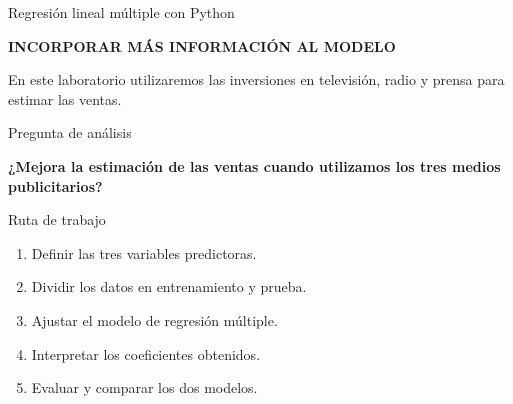 \documentclass[aspectratio=169,11pt]{beamer}
\newcommand{\kicker}[1]{%
  {\scriptsize\bfseries\color{cAcc}\MakeUppercase{#1}}%
  \par\vspace{0.2em}%
}
\newcommand{\pregunta}[1]{%
  {\color{cAcc}\bfseries #1}%
}
\newenvironment{cerrado}[1]
  {\begin{block}{#1}
   \begin{minipage}{\linewidth}
   \raggedright}
  {\end{minipage}
   \end{block}}
\begin{document}
\begin{frame}{Regresión lineal múltiple con Python}

  \begin{center}
    \begin{minipage}{0.86\textwidth}

      \small

      \kicker{INCORPORAR MÁS INFORMACIÓN AL MODELO}

      En este laboratorio utilizaremos las inversiones en televisión,
      radio y prensa para estimar las ventas.

      \vspace{0.35em}

      \begin{cerrado}{Pregunta de análisis}

        \begin{center}
          \pregunta{¿Mejora la estimación de las ventas cuando
          utilizamos los tres medios publicitarios?}
        \end{center}

      \end{cerrado}

      \vspace{0.3em}

      \begin{cerrado}{Ruta de trabajo}

        \begin{enumerate}
          \setlength{\itemsep}{0.15em}

          \item Definir las tres variables predictoras.
          \item Dividir los datos en entrenamiento y prueba.
          \item Ajustar el modelo de regresión múltiple.
          \item Interpretar los coeficientes obtenidos.
          \item Evaluar y comparar los dos modelos.

        \end{enumerate}

      \end{cerrado}

    \end{minipage}
  \end{center}

\end{frame}
\end{document}
